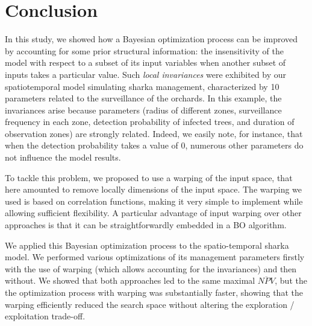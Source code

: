 \section{Conclusion}
In this study, we showed how a Bayesian optimization process can be improved by accounting for some prior structural information: 
the insensitivity of the model with respect to a subset of its input variables when another subset of inputs takes a particular value.
Such \textit{local invariances} were exhibited by our
spatiotemporal model simulating sharka management, characterized by 10 parameters related to the surveillance of the orchards. 
In this example, the invariances arise because parameters (radius of different zones, surveillance frequency in each zone, detection probability of infected trees, 
and duration of observation zones) are strongly related. Indeed, we easily note, for instance, that when the detection probability takes a value of 0, 
numerous other parameters do not influence the model results. 
% 

To tackle this problem, we proposed to use a warping of the input space, that here amounted to remove locally dimensions of the input space.
The warping we used is based on correlation functions, making it very simple to implement while allowing sufficient flexibility.
A particular advantage of input warping over other approaches is that it can be straightforwardly embedded in a BO algorithm.
% 

We applied this Bayesian optimization process to the spatio-temporal sharka model. We performed various optimizations of its management parameters 
firstly with the use of warping (which allows accounting for the invariances) and then without. 
We showed that both approaches led to the same maximal $\overline{NPV}$, but the the optimization process with warping was substantially faster,
showing that the warping efficiently reduced the search space without altering the exploration / exploitation trade-off.

